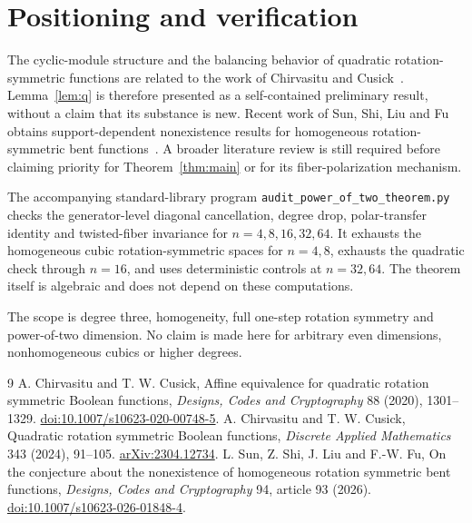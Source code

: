 \documentclass[11pt]{article}
\begin{document}
\section{Positioning and verification}
The cyclic-module structure and the balancing behavior of quadratic rotation-symmetric functions are related to the work of Chirvasitu and Cusick~\cite{cc2020,cc2024}. Lemma~\ref{lem:q} is therefore presented as a self-contained preliminary result, without a claim that its substance is new. Recent work of Sun, Shi, Liu and Fu obtains support-dependent nonexistence results for homogeneous rotation-symmetric bent functions~\cite{sun2026}. A broader literature review is still required before claiming priority for Theorem~\ref{thm:main} or for its fiber-polarization mechanism.

The accompanying standard-library program \texttt{audit\_power\_of\_two\_theorem.py} checks the generator-level diagonal cancellation, degree drop, polar-transfer identity and twisted-fiber invariance for \(n=4,8,16,32,64\). It exhausts the homogeneous cubic rotation-symmetric spaces for \(n=4,8\), exhausts the quadratic check through \(n=16\), and uses deterministic controls at \(n=32,64\). The theorem itself is algebraic and does not depend on these computations.

The scope is degree three, homogeneity, full one-step rotation symmetry and power-of-two dimension. No claim is made here for arbitrary even dimensions, nonhomogeneous cubics or higher degrees.

\begin{thebibliography}{9}
 A. Chirvasitu and T. W. Cusick, Affine equivalence for quadratic rotation symmetric Boolean functions, \emph{Designs, Codes and Cryptography} 88 (2020), 1301--1329. \href{https://doi.org/10.1007/s10623-020-00748-5}{doi:10.1007/s10623-020-00748-5}.
 A. Chirvasitu and T. W. Cusick, Quadratic rotation symmetric Boolean functions, \emph{Discrete Applied Mathematics} 343 (2024), 91--105. \href{https://arxiv.org/abs/2304.12734}{arXiv:2304.12734}.
 L. Sun, Z. Shi, J. Liu and F.-W. Fu, On the conjecture about the nonexistence of homogeneous rotation symmetric bent functions, \emph{Designs, Codes and Cryptography} 94, article 93 (2026). \href{https://doi.org/10.1007/s10623-026-01848-4}{doi:10.1007/s10623-026-01848-4}.
\end{thebibliography}
\end{document}
